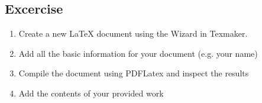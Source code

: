 \subsection{Excercise}
\begin{frame}
	\begin{enumerate}
		\item Create a new \LaTeX{} document using the Wizard in Texmaker.
		\item Add all the basic information for your document (e.g. your name)
		\item Compile the document using PDFLatex and inspect the results
		\item Add the contents of your provided work
	\end{enumerate}
\end{frame}
